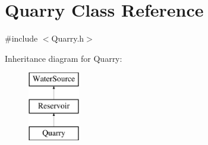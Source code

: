 \hypertarget{classQuarry}{}\section{Quarry Class Reference}
\label{classQuarry}


{\ttfamily \#include $<$Quarry.\+h$>$}

Inheritance diagram for Quarry\+:\begin{figure}[H]
\begin{center}
\leavevmode
\includegraphics[height=3.000000cm]{classQuarry}
\end{center}
\end{figure}
